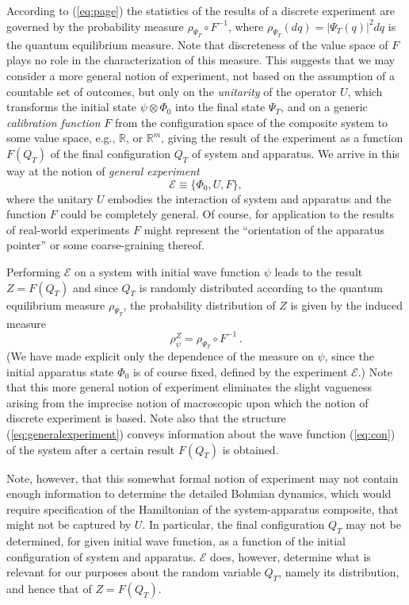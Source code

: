 \documentclass[12pt]{article}
\newcommand{\eq}[1]{(\ref{#1})}
\newcommand{\wf}{wave function}
\newcommand{\R}{\mathbb{R}}
\newcommand{\E}{\mbox{$\mathscr{E}$}}
\begin{document}
According to (\ref{eq:page}) the statistics of the results of a
discrete experiment are governed by the probability measure
$\rho_{\Psi_T}\circ F^{-1}$, where $\rho_{\Psi_T}(dq)
=|\Psi_{T}(q)|^{2}dq$ is the quantum equilibrium measure.  Note that
discreteness of the value space of $F$ plays no role in the
characterization of this measure.  This suggests that we may consider
a more general notion of experiment, not based on the assumption of a
countable set of outcomes, but only on the \emph{unitarity} of the
operator $U$, which transforms the initial state $\psi\otimes\Phi_{0}$
into the final state $\Psi_{T}$, and on a generic \emph{calibration
   function} $F$ {}from the configuration space of the composite system
to some value space, e.g., $\R$, or ${\R}^m$, giving the result of the
experiment as a function $ F(Q_T)$ of the final configuration $Q_T$ of
system and apparatus.  We arrive in this way at the notion of
\emph{general experiment}
\begin{equation}
\E{}\equiv\{\Phi_{0}, U, F\},
\label{eq:generalexperiment}
\end{equation}
where the unitary $U$ embodies the interaction of system and apparatus
and the function $F$ could be completely general.  Of course, for
application to the results of real-world experiments $F$ might
represent the ``orientation of the apparatus pointer'' or some
coarse-graining thereof.

Performing \E{} on a system with initial \wf{} $\psi$ leads to the
result ${Z}= F(Q_T)$ and since $Q_{T}$ is randomly distributed
according to the quantum equilibrium measure $\rho_{\Psi_T}$, the
probability distribution of $Z$ is given by the induced measure
\begin{equation}
\rho^{ Z}_{\psi}= \rho_{\Psi_T}\circ
F^{-1}\,.
\label{eq:indumas}
\end{equation}
(We have made explicit only the dependence of the measure on $\psi$,
since the initial apparatus state $\Phi_{0}$ is of course fixed,
defined by the experiment \E{}.)  Note that this more general notion
of experiment eliminates the slight vagueness arising {}from the
imprecise notion of macroscopic upon which the notion of discrete
experiment is based.  Note also that the structure
\eq{eq:generalexperiment} conveys information about the wave function
\eq{eq:con} of the system after a certain result $F(Q_T)$ is obtained.

Note, however, that this somewhat formal notion of experiment may not
contain enough information to determine the detailed Bohmian dynamics,
which would require specification of the Hamiltonian of the
system-apparatus composite, that might not be captured by $U$. In
particular, the final configuration $Q_T$ may not be determined, for
given initial \wf{}, as a function of the initial configuration of
system and apparatus. \E{} does, however, determine what is relevant
for our purposes about the random variable $Q_T$, namely its
distribution, and hence that of $Z=F(Q_T)$.
\end{document}
